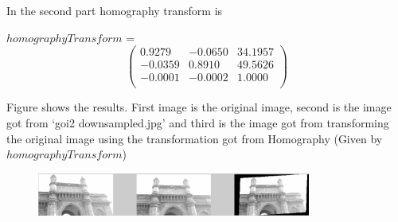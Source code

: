 \documentclass[a4paper,10pt]{article}
\begin{document}
In the second part homography transform is 

    $homographyTransform$ = \[ \left( \begin{array}{cccc}
    0.9279 & -0.0650 & 34.1957\\
   -0.0359 &  0.8910 & 49.5626\\
   -0.0001 & -0.0002 &  1.0000\\
             \end{array} \right)\]       

Figure shows the results. First image is the original image, second is the image got from ‘goi2 downsampled.jpg’
and third is the image got from transforming the original image using the transformation got from Homography (Given by $homographyTransform$)
\begin{figure}[ht!]
\centering
\includegraphics[width=90mm]{figure2.png}
\caption{}
\end{figure}
\end{document}
